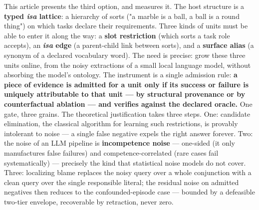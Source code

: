 \documentclass[11pt]{article}
\begin{document}
This article presents the third option, and measures it. The host structure is a \textbf{typed \emph{isa} lattice}: a hierarchy of sorts ("a marble is a ball, a ball is a round thing") on which tasks declare their requirements. Three kinds of units must be able to enter it along the way: a \textbf{slot restriction} (which sorts a task role accepts), an \textbf{\emph{isa} edge} (a parent-child link between sorts), and a \textbf{surface alias} (a synonym of a declared vocabulary word). The need is precise: grow these three units online, from the noisy extractions of a small local language model, without absorbing the model's ontology. The instrument is a single admission rule: \textbf{a piece of evidence is admitted for a unit only if its success or failure is uniquely attributable to that unit — by structural provenance or by counterfactual ablation — and verifies against the declared oracle.} One gate, three grains. The theoretical justification takes three steps. One: candidate elimination, the classical algorithm for learning such restrictions, is provably intolerant to noise — a single false negative expels the right answer forever. Two: the noise of an LLM pipeline is \textbf{incompetence noise} — one-sided (it only manufactures false failures) and competence-correlated (rare cases fail systematically) — precisely the kind that statistical noise models do not cover. Three: localizing blame replaces the noisy query over a whole conjunction with a clean query over the single responsible literal; the residual noise on admitted negatives then reduces to the confounded-episode case — bounded by a defeasible two-tier envelope, recoverable by retraction, never zero.
\end{document}
